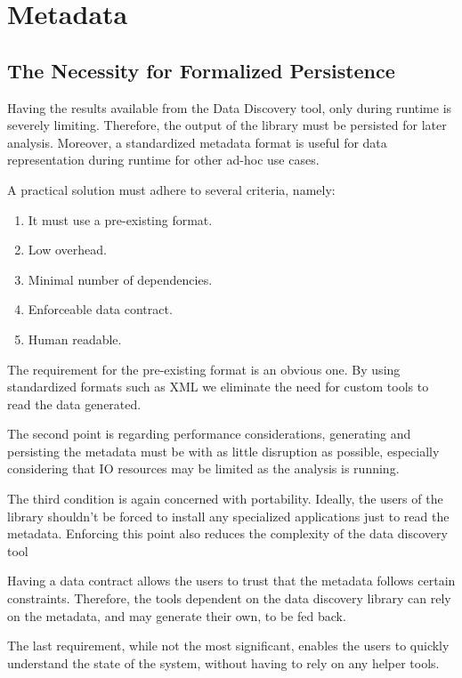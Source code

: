 \section{Metadata}
\subsection{The Necessity for Formalized Persistence}

Having the results available from the Data Discovery tool, only during runtime is severely limiting.
Therefore, the output of the library must be persisted for later analysis.
Moreover, a standardized
metadata format is useful for data representation during runtime for other ad-hoc use cases.
\newline

A practical solution must adhere to several criteria, namely:
\begin{enumerate}
    \item It must use a pre-existing format.
    \item Low overhead.
    \item Minimal number of dependencies.
    \item Enforceable data contract.
    \item Human readable.
\end{enumerate}

The requirement for the pre-existing format is an obvious one.
By using standardized formats such as XML we eliminate the need for custom tools to read the
data generated.

The second point is regarding performance considerations, generating and persisting the metadata must be
with as little disruption as possible, especially considering that IO resources may be limited as the
analysis is running.

The third condition is again concerned with portability.
Ideally, the users of the library shouldn't be
forced to install any specialized applications just to read the metadata.
Enforcing this point also reduces the complexity of the data discovery tool

Having a data contract allows the users to trust that the metadata follows certain constraints.
Therefore, the tools dependent on the data discovery library can rely on the metadata, and may generate their own,
to be fed back.

The last requirement, while not the most significant, enables the users to quickly understand the
state of the system, without having to rely on any helper tools.


